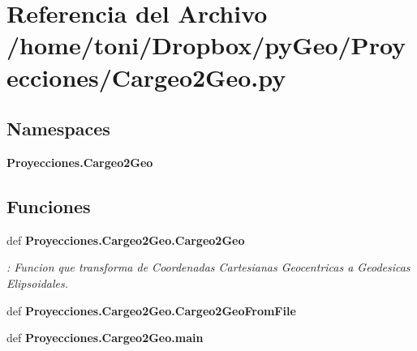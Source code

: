 \section{Referencia del Archivo /home/toni/\-Dropbox/py\-Geo/\-Proyecciones/\-Cargeo2\-Geo.py}
\label{Cargeo2Geo_8py}
\subsection*{Namespaces}
\begin{DoxyCompactItemize}
\item 
{\bf Proyecciones.\-Cargeo2\-Geo}
\end{DoxyCompactItemize}
\subsection*{Funciones}
\begin{DoxyCompactItemize}
\item 
def {\bf Proyecciones.\-Cargeo2\-Geo.\-Cargeo2\-Geo}
\begin{DoxyCompactList}\small\item\em \-: Funcion que transforma de Coordenadas Cartesianas Geocentricas a Geodesicas Elipsoidales. \end{DoxyCompactList}\item 
def {\bf Proyecciones.\-Cargeo2\-Geo.\-Cargeo2\-Geo\-From\-File}
\item 
def {\bf Proyecciones.\-Cargeo2\-Geo.\-main}
\end{DoxyCompactItemize}
